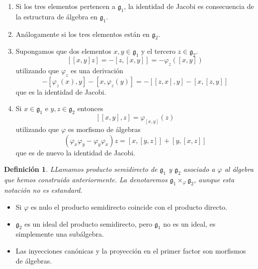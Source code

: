 \documentclass[a4paper,draft,12pt]{scrartcl}
\newtheorem{defi}{Definición}[section]%
\newcommand{\df}[1]{\textsf{\color{blue}#1}}
\begin{document}
\begin{enumerate}[1.- ]

\item Si los tres elementos pertencen a $\mathfrak{g}_1$, la identidad de Jacobi es consecuencia de la estructura de álgebra en $\mathfrak{g}_1$.

\item Análogamente si los tres elementos están en $\mathfrak{g}_2$.

\item Supongamos que dos elementos $x,y \in \mathfrak{g}_1$ y el tercero $z \in \mathfrak{g}_2$.
$$
[[x,y]z]=-[z,[x,y]]= -\varphi_z([x,y])
$$
utilizando que $\varphi_z$ es una derivación
$$
-[\varphi_z(x),y]-[x,\varphi_z(y)]= -[[z,x],y]-[x,[z,y]]
$$
que es la identidad de Jacobi.

\item Si $x \in \mathfrak{g}_1$ e $y,z \in \mathfrak{g}_2$ entonces
$$
[[x,y],z]= \varphi_{[x,y]}(z)
$$
utilizando que $\varphi$ es morfismo de álgebras
$$
(\varphi_x \varphi_y - \varphi_y\varphi_x)z = [x,[y,z]]+[y,[x,z]]
$$
que es de nuevo la identidad de Jacobi.

\end{enumerate}

\begin{defi}

LLamamos  \df{producto semidirecto}  de $\mathfrak{g}_1$ y $\mathfrak{g}_2$ asociado a $\varphi$ al álgebra que hemos construido anteriormente.  La denotaremos $\mathfrak{g}_1 \times_\varphi \mathfrak{g}_2$, aunque esta notación no es estandard.

\end{defi}


\begin{itemize}

\item Si $\varphi$ es nulo el producto semidirecto coincide con el producto directo.

\item $\mathfrak{g}_2$ es un ideal del producto semidirecto, pero $\mathfrak{g}_1$ no es un ideal, es simplemente una subálgebra.

\item Las inyecciones canónicas y la proyección en el primer factor son morfismos de álgebras.

\end{itemize}
\end{document}
